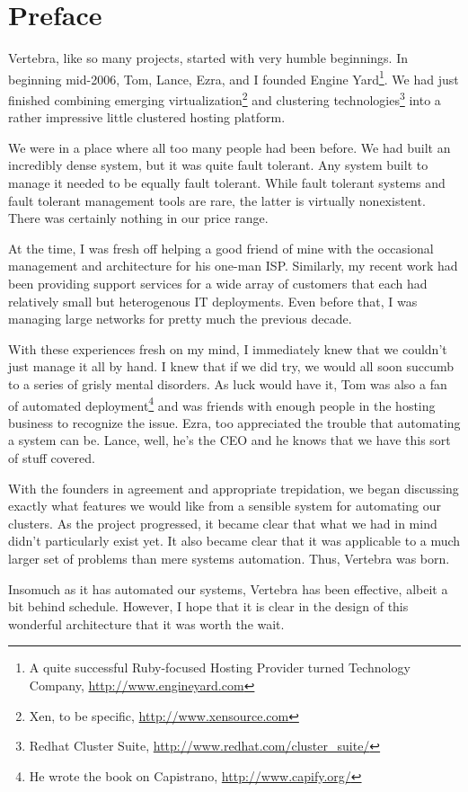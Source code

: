 \chapter{Preface}

Vertebra, like so many projects, started with very humble beginnings. In beginning mid-2006, Tom, Lance, Ezra, and I founded Engine Yard\footnote{A quite successful Ruby-focused Hosting Provider turned Technology Company, \url{http://www.engineyard.com}}. We had just finished combining emerging virtualization\footnote{Xen, to be specific, \url{http://www.xensource.com}} and clustering technologies\footnote{Redhat Cluster Suite, \url{http://www.redhat.com/cluster_suite/}} into a rather impressive little clustered hosting platform.

We were in a place where all too many people had been before. We had built an incredibly dense system, but it was quite fault tolerant.  Any system built to manage it needed to be equally fault tolerant.  While fault tolerant systems and fault tolerant management tools are rare, the latter is virtually nonexistent.  There was certainly nothing in our price range.

At the time, I was fresh off helping a good friend of mine with the occasional management and architecture for his one-man ISP. Similarly, my recent work had been providing support services for a wide array of customers that each had relatively small but heterogenous IT deployments. Even before that, I was managing large networks for pretty much the previous decade.

With these experiences fresh on my mind, I immediately knew that we couldn't just manage it all by hand. I knew that if we did try, we would all soon succumb to a series of grisly mental disorders. As luck would have it, Tom was also a fan of automated deployment\footnote{He wrote the book on Capistrano, \url{http://www.capify.org/}} and was friends with enough people in the hosting business to recognize the issue. Ezra, too appreciated the trouble that automating a system can be.  Lance, well, he's the CEO and he knows that we have this sort of stuff covered.

With the founders in agreement and appropriate trepidation, we began discussing exactly what features we would like from a sensible system for automating our clusters. As the project progressed, it became clear that what we had in mind didn't particularly exist yet. It also became clear that it was applicable to a much larger set of problems than mere systems automation. Thus, Vertebra was born.

Insomuch as it has automated our systems, Vertebra has been effective, albeit a bit behind schedule. However, I hope that it is clear in the design of this wonderful architecture that it was worth the wait.
